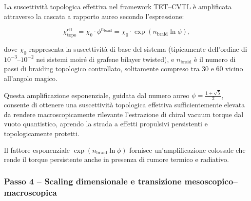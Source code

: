 \documentclass[11pt,a4paper]{article}
\theoremstyle{plain}
\theoremstyle{definition}
\begin{document}
\begin{tcolorbox}[
    colback=violet!5!white,
    colframe=purple!70!black,
    coltitle=white,
    fonttitle=\bfseries,
    title=Susceptibilità Topologica Effettiva e Amplificazione Aurea,
    sharp corners,
    boxrule=0.8pt,
    enhanced,
    attach boxed title to top left={xshift=12pt, yshift=-3mm},
    boxed title style={colback=purple!80!black}
]

La suscettività topologica effettiva nel framework TET–CVTL è amplificata attraverso la cascata a rapporto aureo secondo l'espressione:

\begin{equation}
\chi_{\text{topo}}^{\text{eff}} = \chi_0 \cdot \phi^{n_{\text{braid}}} = \chi_0 \cdot \exp\left(n_{\text{braid}} \ln\phi\right),
\label{eq:effective_susceptibility}
\end{equation}



\end{tcolorbox}


\vspace{0.3cm}

dove \(\chi_0\) rappresenta la suscettività di base del sistema (tipicamente dell'ordine di \(10^{-3}\)–\(10^{-2}\) nei sistemi moiré di grafene bilayer twisted), e \(n_{\text{braid}}\) è il numero di passi di braiding topologico controllato, solitamente compreso tra 30 e 60 vicino all'angolo magico.



\vspace{0.3cm}

Questa amplificazione esponenziale, guidata dal numero aureo \(\phi = \frac{1+\sqrt{5}}{2}\), consente di ottenere una suscettività topologica effettiva sufficientemente elevata da rendere macroscopicamente rilevante l'estrazione di chiral vacuum torque dal vuoto quantistico, aprendo la strada a effetti propulsivi persistenti e topologicamente protetti.



\vspace{0.3cm}


Il fattore esponenziale $\exp(n_{\text{braid}} \ln\phi)$ fornisce un'amplificazione colossale che rende il torque persistente anche in presenza di rumore termico e radiativo.


\vspace{0.3cm}




\subsubsection{Passo 4 – Scaling dimensionale e transizione mesoscopico–macroscopica}
\end{document}
